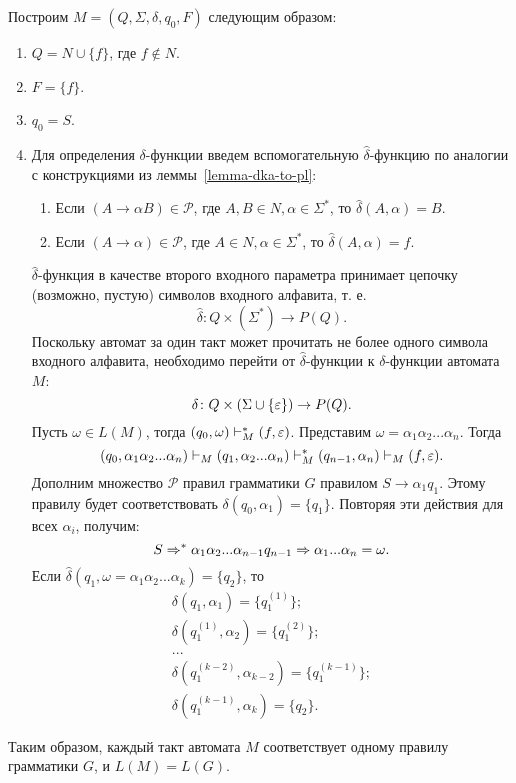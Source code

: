 \begin{myproof}
Построим $M = (Q, \Sigma, \delta, q_0, F)$ следующим образом:
\begin{enumerate}
	\item $Q = N \cup \{ f \}$, где $f \notin N$.
	\item $F = \{ f \}$.
	\item $q_0 = S$.
	\item Для определения $\delta$-функции введем вспомогательную $\hat{\delta}$-функцию по аналогии с конструкциями из леммы~\ref{lemma-dka-to-pl}:
		\begin{enumerate}
			\item Если $(A \to \alpha B)\in \mathcal P$, где $A, B \in N, \alpha \in \Sigma^*$, то $\hat{\delta}(A, \alpha) = B$.
			\item Если $(A \to \alpha)\in \mathcal P$, где $A \in N, \alpha \in \Sigma^*$, то $\hat{\delta}(A, \alpha) = f$.
		\end{enumerate}
		$\hat{\delta}$-функция в качестве второго входного параметра принимает цепочку (возможно, пустую) символов входного алфавита, т. е.
		\[
			\hat{\delta} \colon Q \times (\Sigma^*) \to P(Q).
		\]
		Поскольку автомат за один такт может прочитать не более одного символа входного алфавита, необходимо перейти от $\hat{\delta}$-функции к $\delta$-функции автомата $M$:
		\[
			\delta \colon Q \times (\Sigma \cup \{ \varepsilon \} ) \to P(Q).
		\]
		Пусть $\omega \in L(M)$, тогда $(q_0,\omega)\vdash_M^*(f,\varepsilon)$.
		Представим $\omega = \alpha_1\alpha_2...\alpha_n$. Тогда
		\[
			(q_0, \alpha_1\alpha_2...\alpha_n)\vdash_M(q_1, \alpha_2...\alpha_n)\vdash_M^*(q_{n-1}, \alpha_n)\vdash_M(f, \varepsilon).
		\]
Дополним множество $\mathcal P$ правил грамматики $G$ правилом $S \to \alpha_1q_1$. Этому правилу будет соответствовать $\delta(q_0, \alpha_1) = \{q_1\}$.
		Повторяя эти действия для всех $\alpha_i$, получим:
		\[
			S \Rightarrow^* \alpha_1\alpha_2...\alpha_{n-1}q_{n-1} \Rightarrow \alpha_1...\alpha_n = \omega.
		\]
		Если $\hat{\delta}(q_1, \omega = \alpha_1\alpha_2...\alpha_k) = \{q_2\}$, то
		\[
			\begin{array}{l}
			\delta(q_1, \alpha_1) = \{q_1^{(1)}\};  \\
			\delta(q_1^{(1)}, \alpha_2) = \{q_1^{(2)}\}; \\
			... \\
			\delta(q_1^{(k-2)}, \alpha_{k-2}) = \{q_1^{(k-1)}\};\\
			\delta(q_1^{(k-1)}, \alpha_k) = \{q_2\}.
			\end{array}
		\]
	\end{enumerate}
	Таким образом, каждый такт автомата $M$ соответствует одному правилу грамматики $G$, и $L(M) = L(G)$.
\end{myproof}
